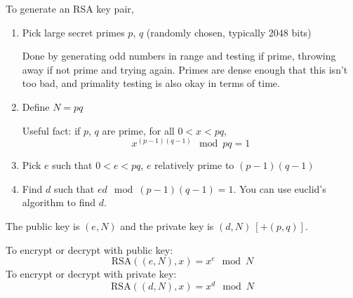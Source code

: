 To generate an RSA key pair,
\begin{enumerate}
    \item Pick large secret primes $p$, $q$ (randomly chosen, typically 2048
            bits)

        Done by generating odd numbers in range and testing if prime, throwing
        away if not prime and trying again. Primes are dense enough that this
        isn't too bad, and primality testing is also okay in terms of time.
    \item Define $N = pq$

        Useful fact: if $p$, $q$ are prime, for all $0 < x < pq$,
        $$x^{(p-1)(q-1)} \mod{pq} = 1$$
    \item Pick $e$ such that $0 < e < pq$, $e$ relatively prime to $(p-1)(q-1)$
    \item Find $d$ such that $ed \mod{(p-1)(q-1)} = 1$. You can use euclid's algorithm to find $d$.
\end{enumerate}
The public key is $(e, N)$ and the private key is $(d, N)\ [+(p,q)]$.

To encrypt or decrypt with public key:
$$\text{RSA}((e,N), x) = x^e \mod N$$
To encrypt or decrypt with private key:
$$\text{RSA}((d,N), x) = x^d \mod N$$

